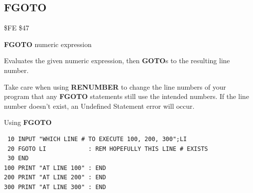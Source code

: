 \subsection{FGOTO}
\begin{description}[leftmargin=2cm,style=nextline]
\item [Token:]    \$FE \$47
\item [Format:]   {\bf FGOTO} numeric expression
\item [Usage:]    Evaluates the given numeric expression, then {\bf GOTO}s to the resulting line number.

\item [Remarks:]  Take care when using {\bf RENUMBER} to change the line numbers of your program that any {\bf FGOTO} statements still use the intended numbers. If the line number doesn't exist, an Undefined Statement error will occur.

\item [Example:]  Using {\bf FGOTO}

\begin{tcolorbox}[colback=black,coltext=white]
\verbatimfont{\codefont}
\begin{verbatim}
 10 INPUT "WHICH LINE # TO EXECUTE 100, 200, 300";LI
 20 FGOTO LI            : REM HOPEFULLY THIS LINE # EXISTS
 30 END
100 PRINT "AT LINE 100" : END
200 PRINT "AT LINE 200" : END
300 PRINT "AT LINE 300" : END
\end{verbatim}
\end{tcolorbox}
\end{description}


\newpage
